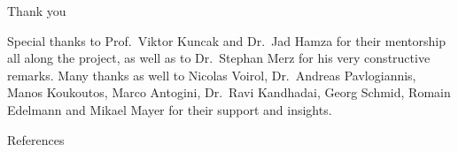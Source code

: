 \documentclass[ignorenonframetext,]{beamer}
\newif\ifbibliography
\begin{document}
\begin{frame}{%
\protect\hypertarget{thank-you-1}{%
Thank you}}

Special thanks to Prof.~Viktor Kuncak and Dr.~Jad Hamza for their
mentorship all along the project, as well as to Dr.~Stephan Merz for his
very constructive remarks. Many thanks as well to Nicolas Voirol,
Dr.~Andreas Pavlogiannis, Manos Koukoutos, Marco Antogini, Dr.~Ravi
Kandhadai, Georg Schmid, Romain Edelmann and Mikael Mayer for their
support and insights.

\end{frame}

\begin{frame}[allowframebreaks]{References}
\bibliographytrue
\printbibliography[heading=none]
\end{frame}
\end{document}

